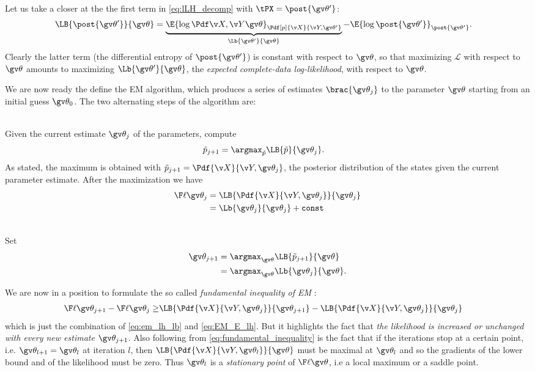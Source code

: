 Let us take a closer at the the first term in \eqref{eq:lLH_decomp} with $\tPX=\post{\Th'}$:
\begin{align}
	\LB{\post{\Th'}}{\Th}&=
	\underbrace{\E{\log\cLH}_{\Pdf[p]{\X}{\Y,\Th'}}}_{\Lb{\Th'}{\Th}} 
	-\E{\log\post{\Th'}}_{\post{\Th'}}.
	\label{eq:completedata_loglikelihood}
\end{align}
Clearly the latter term (the differential entropy of $\post{\Th'}$) is constant 
with respect to $\Th$, so that maximizing $\mathcal{L}$ with respect to $\Th$ amounts to
maximizing $\Lb{\Th'}{\Th}$, the \emph{expected complete-data log-likelihood},
with respect to $\Th$.


We are now ready the define the EM algorithm, which produces
a series of estimates $\brac{\Th_j}$ to the parameter $\Th$
starting from an initial guess $\Th_0$. The two alternating
steps of the algorithm are:

\begin{description}
\addtolength{\leftskip}{1cm}
  \item[E-step]\hfill\\
  Given the current estimate $\Th_j$ of the parameters, compute	
  	\begin{align}
		\tP_{j+1} &= \argmax_{\tP}\LB{\tP}{\Th_j}.
		\label{eq:EM_E}
	\end{align}
  As stated, the maximum is obtained with 
  $\tP_{j+1} = \Pdf{\X}{\Y,\Th_j}$, the posterior
  distribution of the states given the current parameter estimate. After the maximization
  we have
  	\begin{align}
  		\lLH[\Th_j]&=\LB{\Pdf{\X}{\Y,\Th_j}}{\Th_j} \label{eq:EM_E_lh}\\
  		 &= \Lb{\Th_j}{\Th_j}+\mathtt{const}\nonumber 
	\end{align}
  \item[M-step]\hfill\\ 
  Set
    \begin{align}
		\Th_{j+1}&=\argmax_{\Th}\LB{\tP_{j+1}}{\Th} \label{eq:EM_M}\\
		&=\argmax_{\Th}\Lb{\Th_j}{\Th}\nonumber.
	\end{align}
\end{description}
We are now in a position to formulate the so called \emph{fundamental inequality of EM} \parencite{Cappe2005}:
\begin{align}
	\lLH[\Th_{j+1}] - \lLH[\Th_j]\geq & \LB{\Pdf{\X}{\Y,\Th_j}}{\Th_{j+1}} - \LB{\Pdf{\X}{\Y,\Th_j}}{\Th_{j}} 
	\label{eq:fundamental_inequality}
\end{align}
which is just the combination of \eqref{eq:em_lh_lb} and \eqref{eq:EM_E_lh}. But it highlights
the fact that \emph{the likelihood is increased or unchanged with every new estimate} $\Th_{j+1}$.
Also following from \eqref{eq:fundamental_inequality} is the fact that if the iterations
stop at a certain point, i.e. $\Th_{l+1}=\Th_l$ at iteration $l$, then
$\LB{\Pdf{\X}{\Y,\Th_l}}{\Th}$ must be maximal at $\Th_l$
and so the gradients of the lower bound and of the likelihood must be zero. Thus
$\Th_l$ is a \emph{stationary point} of $\lLH$, i.e a local maximum or a saddle point.


